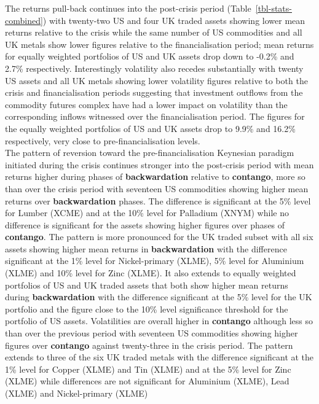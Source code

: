 \documentclass[
  authoryear,
  preprint,
  3p]{elsarticle}
\begin{document}
The returns pull-back continues into the post-crisis period
(Table~\ref{tbl-stats-combined}) with twenty-two US and four UK traded
assets showing lower mean returns relative to the crisis while the same
number of US commodities and all UK metals show lower figures relative
to the financialisation period; mean returns for equally weighted
portfolios of US and UK assets drop down to -0.2\% and 2.7\%
respectively. Interestingly volatility also recedes substantially with
twenty US assets and all UK metals showing lower volatility figures
relative to both the crisis and financialisation periods suggesting that
investment outflows from the commodity futures complex have had a lower
impact on volatility than the corresponding inflows witnessed over the
financialisation period. The figures for the equally weighted portfolios
of US and UK assets drop to 9.9\% and 16.2\% respectively, very close to
pre-financialisation levels.\\
The pattern of reversion toward the pre-financialisation Keynesian
paradigm initiated during the crisis continues stronger into the
post-crisis period with mean returns higher during phases of
\textbf{backwardation} relative to \textbf{contango}, more so than over
the crisis period with seventeen US commodities showing higher mean
returns over \textbf{backwardation} phases. The difference is
significant at the 5\% level for Lumber (XCME) and at the 10\% level for
Palladium (XNYM) while no difference is significant for the assets
showing higher figures over phases of \textbf{contango}. The pattern is
more pronounced for the UK traded subset with all six assets showing
higher mean returns in \textbf{backwardation} with the difference
significant at the 1\% level for Nickel-primary (XLME), 5\% level for
Aluminium (XLME) and 10\% level for Zinc (XLME). It also extends to
equally weighted portfolios of US and UK traded assets that both show
higher mean returns during \textbf{backwardation} with the difference
significant at the 5\% level for the UK portfolio and the figure close
to the 10\% level significance threshold for the portfolio of US assets.
Volatilities are overall higher in \textbf{contango} although less so
than over the previous period with seventeen US commodities showing
higher figures over \textbf{contango} against twenty-three in the crisis
period. The pattern extends to three of the six UK traded metals with
the difference significant at the 1\% level for Copper (XLME) and Tin
(XLME) and at the 5\% level for Zinc (XLME) while differences are not
significant for Aluminium (XLME), Lead (XLME) and Nickel-primary (XLME)
\end{document}
